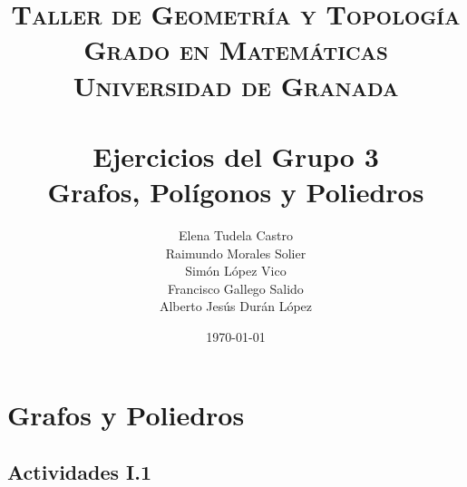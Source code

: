 
\usepackage{listings}
\usepackage{dsfont}
\usepackage{booktabs}

\title{	
\normalfont \normalsize 
\textsc{\textbf{Taller de Geometría y Topología} \\ Grado en Matemáticas \\ Universidad de Granada} \\ [25pt] %
\horrule{0.5pt} \\[0.4cm] %
\huge Ejercicios del Grupo 3  \\
	Grafos, Polígonos y Poliedros %
\horrule{2pt} \\[0.5cm] %
}
\author{	
		Elena Tudela Castro \\
		Raimundo Morales Solier \\
		Simón López Vico \\
		Francisco Gallego Salido \\
		Alberto Jesús Durán López} %
\date{\normalsize\today} %




\maketitle %

\newpage %







\section{Grafos y Poliedros}


\subsection{Actividades I.1}


